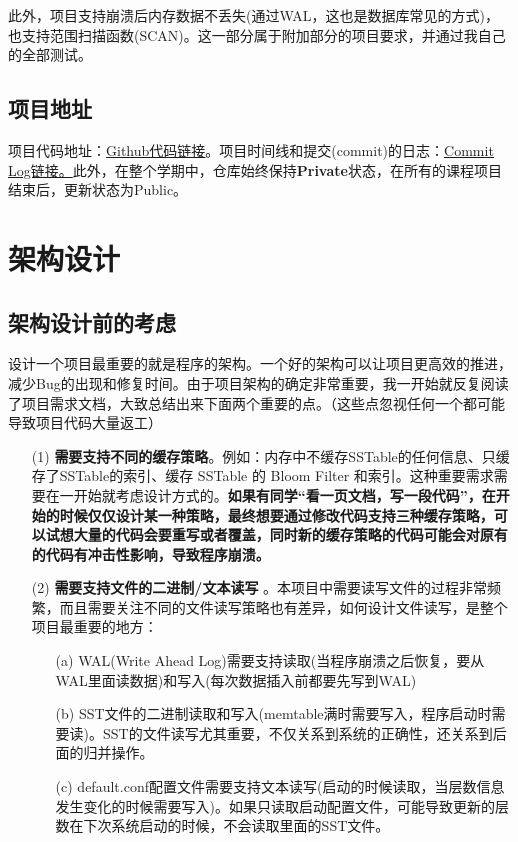 \documentclass[fontset=windows]{article}
\begin{document}
此外，项目支持崩溃后内存数据不丢失(通过WAL，这也是数据库常见的方式)，也支持范围扫描函数(SCAN)。这一部分属于附加部分的项目要求，并通过我自己的全部测试。

\subsection{项目地址}
项目代码地址：\href{https://github.com/Musicminion/2022-2023-2-Advanced-Data-Structure}{\underline{Github代码链接}}。项目时间线和提交(commit)的日志：\href{https://github.com/Musicminion/2022-2023-2-Advanced-Data-Structure/commits/main}{\underline{Commit Log链接}。}此外，在整个学期中，仓库始终保持\textbf{Private}状态，在所有的课程项目结束后，更新状态为Public。

\section{架构设计}

\subsection{架构设计前的考虑}
设计一个项目最重要的就是程序的架构。一个好的架构可以让项目更高效的推进，减少Bug的出现和修复时间。由于项目架构的确定非常重要，我一开始就反复阅读了项目需求文档，大致总结出来下面两个重要的点。（这些点忽视任何一个都可能导致项目代码大量返工）

\begin{itemize}
    \item [(1)] 
    \textbf{需要支持不同的缓存策略}。例如：内存中不缓存SSTable的任何信息、只缓存了SSTable的索引、缓存 SSTable 的 Bloom Filter 和索引。这种重要需求需要在一开始就考虑设计方式的。\textbf{如果有同学“看一页文档，写一段代码”，在开始的时候仅仅设计某一种策略，最终想要通过修改代码支持三种缓存策略，可以试想大量的代码会要重写或者覆盖，同时新的缓存策略的代码可能会对原有的代码有冲击性影响，导致程序崩溃。}
    \item [(2)] 
    \textbf{需要支持文件的二进制/文本读写} 。本项目中需要读写文件的过程非常频繁，而且需要关注不同的文件读写策略也有差异，如何设计文件读写，是整个项目最重要的地方：
    \begin{itemize}
    \item [(a)] 
    WAL(Write Ahead Log)需要支持读取(当程序崩溃之后恢复，要从WAL里面读数据)和写入(每次数据插入前都要先写到WAL)
    \item [(b)]
    SST文件的二进制读取和写入(memtable满时需要写入，程序启动时需要读)。SST的文件读写尤其重要，不仅关系到系统的正确性，还关系到后面的归并操作。
    \item [(c)]
    default.conf配置文件需要支持文本读写(启动的时候读取，当层数信息发生变化的时候需要写入)。如果只读取启动配置文件，可能导致更新的层数在下次系统启动的时候，不会读取里面的SST文件。
    \end{itemize}
\end{itemize}
\end{document}
